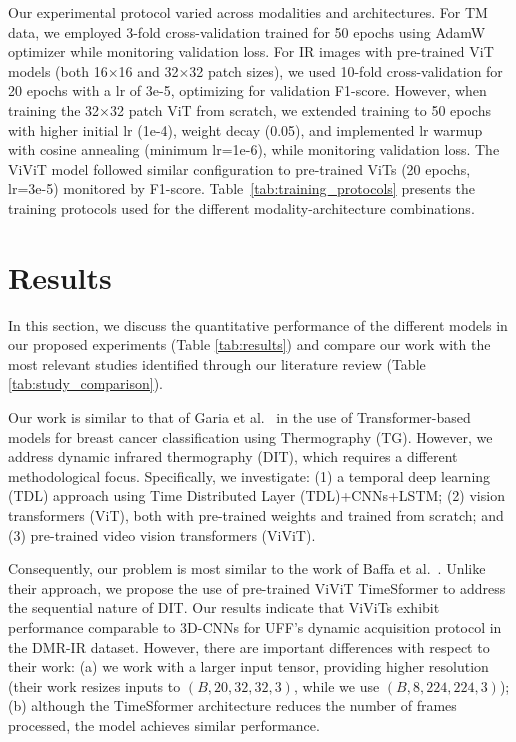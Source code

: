 \documentclass[runningheads]{llncs}
\begin{document}
Our experimental protocol varied across modalities and
architectures. For \ac{TM} data, we employed 3-fold cross-validation
trained for 50 epochs using AdamW optimizer while monitoring
validation loss. For \ac{IR} images with pre-trained \ac{ViT} models
(both 16$\times$16 and 32$\times$32 patch sizes), we used 10-fold
cross-validation for 20 epochs with a \ac{lr} of 3e-5,
optimizing for validation F1-score. However, when training the
32$\times$32 patch \ac{ViT} from scratch, we extended training to 50
epochs with higher initial \ac{lr} (1e-4), weight decay (0.05),
and implemented \ac{lr} warmup with cosine annealing (minimum
lr=1e-6), while monitoring validation loss. The \ac{ViViT} model
followed similar configuration to pre-trained \ac{ViT}s (20 epochs,
lr=3e-5) monitored by F1-score. Table~\ref{tab:training_protocols}
presents the training protocols used for the different
modality-architecture combinations.

\section{Results}
\label{sec:results}
In this section, we discuss the quantitative performance of the
different models in our proposed experiments (Table \ref{tab:results})
and compare our work with the most relevant studies identified through
our literature review (Table \ref{tab:study_comparison}).

Our work is similar to that of Garia et al.~\cite{Garia2023} in the
use of Transformer-based models for breast cancer classification using
Thermography (\ac{TG}). However, we address dynamic infrared thermography
(\ac{DIT}), which requires a different methodological
focus. Specifically, we investigate: (1) a temporal deep learning
(\ac{TDL}) approach using Time Distributed Layer
(\ac{TDL})+\ac{CNNs}+\ac{LSTM}; (2) vision transformers (\ac{ViT}),
both with pre-trained weights and trained from scratch; and (3)
pre-trained video vision transformers (\ac{ViViT}).

Consequently, our problem is most similar to the work of Baffa et
al.~\cite{DeMatheus2023}. Unlike their approach, we propose the use of
pre-trained \ac{ViViT} TimeSformer to address the sequential nature of
\ac{DIT}. Our results indicate that \ac{ViViTs} exhibit performance
comparable to 3D-\ac{CNNs} for UFF's dynamic acquisition protocol in the
DMR-IR dataset. However, there are important differences with respect to
their work: (a) we work with a larger input tensor, providing higher
resolution (their work resizes inputs to $(B, 20, 32, 32, 3)$, while
we use $(B, 8, 224, 224, 3)$); (b) although the TimeSformer
architecture reduces the number of frames processed, the model
achieves similar performance.
\end{document}
